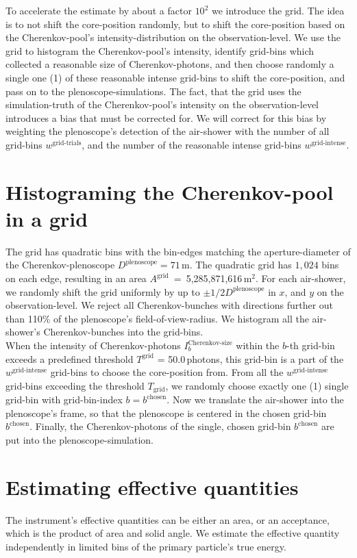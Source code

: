 \documentclass[a4paper,12pt,oneside]{article}
\def\WeightGridTrials{w^\text{grid-trials}}
\def\WeightGridSuccesses{w^\text{grid-intense}}
\begin{document}
%
To accelerate the estimate by about a factor $10^2$ we introduce the grid.
%
The idea is to not shift the core-position randomly, but to shift the core-position based on the Cherenkov-pool's intensity-distribution on the observation-level.
%
We use the grid to histogram the Cherenkov-pool's intensity, identify grid-bins which collected a reasonable size of Cherenkov-photons, and then choose randomly a single one (1) of these reasonable intense grid-bins to shift the core-position, and pass on to the plenoscope-simulations.
%
The fact, that the grid uses the simulation-truth of the Cherenkov-pool's intensity on the observation-level introduces a bias that must be corrected for.
%
We will correct for this bias by weighting the plenoscope's detection of the air-shower with the number of all grid-bins $\WeightGridTrials$, and the number of the reasonable intense grid-bins $\WeightGridSuccesses$.
%
\section{Histograming the Cherenkov-pool in a grid}
\label{SubSecHistogrammingTheCherenkovPool}
%
The grid has quadratic bins with the bin-edges matching the aperture-diameter of the Cherenkov-plenoscope $D^\text{plenoscope} = 71\,$m.
%
The quadratic grid has $1,024$ bins on each edge, resulting in an area \mbox{$A^\text{grid}$ = 5,285,871,616\,m$^{2}$}.
%
For each air-shower, we randomly shift the grid uniformly by up to $\pm1/2 D^\text{plenoscope}$ in $x$, and $y$ on the observation-level.
%
We reject all Cherenkov-bunches with directions further out than 110\% of the plenoscope's field-of-view-radius.
%
We histogram all the air-shower's Cherenkov-bunches into the grid-bins.\\
%
When the intensity of Cherenkov-photons $I^\text{Cherenkov-size}_b$ within the $b$-th grid-bin exceeds a predefined threshold $T^\text{grid}$ = 50.0\,photons, this grid-bin is a part of the $\WeightGridSuccesses$ grid-bins to choose the core-position from.
%
From all the $\WeightGridSuccesses$ grid-bins exceeding the threshold $T_\text{grid}$, we randomly choose exactly one (1) single grid-bin with grid-bin-index $b=b^\text{chosen}$.
%
Now we translate the air-shower into the plenoscope's frame, so that the plenoscope is centered in the chosen grid-bin $b^\text{chosen}$.
%
Finally, the Cherenkov-photons of the single, chosen grid-bin $b^\text{chosen}$ are put into the plenoscope-simulation.
%
\section{Estimating effective quantities}
%
The instrument's effective quantities can be either an area, or an acceptance, which is the product of area and solid angle.
%
We estimate the effective quantity independently in limited bins of the primary particle's true energy.
%
\end{document}
